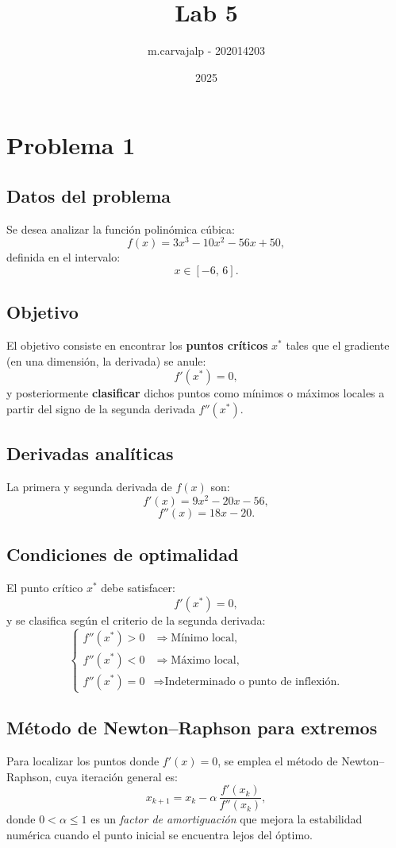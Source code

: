 \documentclass{article}
\title{Lab 5}
\author{m.carvajalp - 202014203}
\date{2025}
\begin{document}
\maketitle

\section{Problema 1}

\subsection{Datos del problema}
Se desea analizar la función polinómica cúbica:
\[
f(x) = 3x^3 - 10x^2 - 56x + 50,
\]
definida en el intervalo:
\[
x \in [-6,\,6].
\]

\subsection{Objetivo}
El objetivo consiste en encontrar los \textbf{puntos críticos} \(x^*\) tales que el gradiente (en una dimensión, la derivada) se anule:
\[
f'(x^*) = 0,
\]
y posteriormente \textbf{clasificar} dichos puntos como mínimos o máximos locales a partir del signo de la segunda derivada \(f''(x^*)\).

\subsection{Derivadas analíticas}
La primera y segunda derivada de \(f(x)\) son:
\[
f'(x) = 9x^2 - 20x - 56,
\]
\[
f''(x) = 18x - 20.
\]

\subsection{Condiciones de optimalidad}
El punto crítico \(x^*\) debe satisfacer:
\[
f'(x^*) = 0,
\]
y se clasifica según el criterio de la segunda derivada:
\[
\begin{cases}
f''(x^*) > 0 & \Rightarrow \text{Mínimo local},\\[4pt]
f''(x^*) < 0 & \Rightarrow \text{Máximo local},\\[4pt]
f''(x^*) = 0 & \Rightarrow \text{Indeterminado o punto de inflexión.}
\end{cases}
\]

\subsection{Método de Newton--Raphson para extremos}
Para localizar los puntos donde \(f'(x) = 0\), se emplea el método de Newton--Raphson, cuya iteración general es:
\[
x_{k+1} = x_k - \alpha\,\frac{f'(x_k)}{f''(x_k)},
\]
donde \(0 < \alpha \leq 1\) es un \textit{factor de amortiguación} que mejora la estabilidad numérica cuando el punto inicial se encuentra lejos del óptimo.
\end{document}
